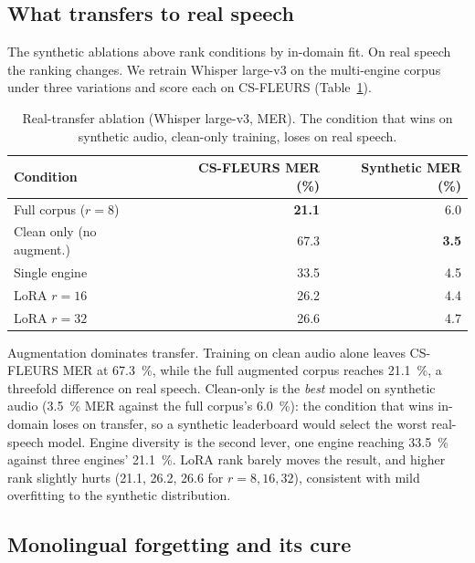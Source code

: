 \documentclass[11pt,a4paper]{article}
\newcommand{\best}[1]{\textbf{#1}}
\begin{document}
\subsection{What transfers to real speech}
\label{sec:realtransfer}

The synthetic ablations above rank conditions by in-domain fit. On real speech the
ranking changes. We retrain Whisper large-v3 on the multi-engine corpus under three
variations and score each on CS-FLEURS (Table~\ref{tab:real-ablation}).

\begin{table}[t]
\centering
\caption{Real-transfer ablation (Whisper large-v3, MER). The condition that wins on
synthetic audio, clean-only training, loses on real speech.}
\label{tab:real-ablation}
\small
\begin{tabular}{lrr}
\toprule
Condition & CS-FLEURS MER (\%) & Synthetic MER (\%) \\
\midrule
Full corpus ($r{=}8$)      & \best{21.1} & 6.0 \\
Clean only (no augment.)   & 67.3 & \best{3.5} \\
Single engine              & 33.5 & 4.5 \\
LoRA $r{=}16$              & 26.2 & 4.4 \\
LoRA $r{=}32$              & 26.6 & 4.7 \\
\bottomrule
\end{tabular}
\end{table}

Augmentation dominates transfer. Training on clean audio alone leaves CS-FLEURS MER
at \SI{67.3}{\percent}, while the full augmented corpus reaches \SI{21.1}{\percent},
a threefold difference on real speech. Clean-only is the \emph{best} model on
synthetic audio (\SI{3.5}{\percent} MER against the full corpus's
\SI{6.0}{\percent}): the condition that wins in-domain loses on transfer, so a
synthetic leaderboard would select the worst real-speech model. Engine diversity is
the second lever, one engine reaching \SI{33.5}{\percent} against three engines'
\SI{21.1}{\percent}. LoRA rank barely moves the result, and higher rank slightly
hurts (\num{21.1}, \num{26.2}, \num{26.6} for $r{=}8,16,32$), consistent with mild
overfitting to the synthetic distribution.

\subsection{Monolingual forgetting and its cure}
\label{sec:forgetting}
\end{document}
